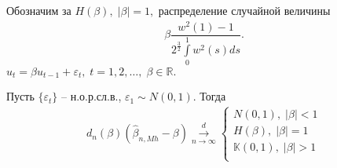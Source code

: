 Обозначим за $ H(\beta), \; |\beta| = 1,  $ распределение случайной величины 
$$\begin{gathered}
    \beta \dfrac{w^2(1) - 1}{2^{\frac{3}{2}}\int\limits_{0}^1w^2(s)ds}.
\end{gathered}$$
$ u_t = \beta u_{t - 1} + \varepsilon_t, \; t = 1, 2, \ldots, \; \beta \in \mathbb{R}.$
\begin{theorem}
    Пусть $ \lbrace \varepsilon_t \rbrace $ -- н.о.р.сл.в., $ \varepsilon_1 \sim N(0,1). $ Тогда 
    $$\begin{gathered}
        d_n(\beta)(\hat{\beta}_{n, Mh} - \beta) \stackrel{d}{\underset{n \longrightarrow \infty}{\longrightarrow}}
        \begin{cases}
            N(0,1), \; |\beta| < 1 \\
            H(\beta), \; |\beta| = 1 \\
            \mathbb{K}(0,1), \; |\beta| > 1 \\
        \end{cases}
    \end{gathered}$$
\end{theorem}
